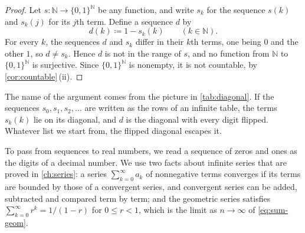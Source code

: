 \begin{proof}
Let $s\colon\mathbb N\to\{0,1\}^{\mathbb N}$ be any function, and write $s_k$ for the sequence $s(k)$ and $s_k(j)$ for its $j$th term. Define a sequence $d$ by
\[
d(k)\coloneqq1-s_k(k)\qquad(k\in\mathbb N).
\]
For every $k$, the sequences $d$ and $s_k$ differ in their $k$th terms, one being $0$ and the other $1$, so $d\ne s_k$. Hence $d$ is not in the range of $s$, and no function from $\mathbb N$ to $\{0,1\}^{\mathbb N}$ is surjective. Since $\{0,1\}^{\mathbb N}$ is nonempty, it is not countable, by \cref{cor:countable}\,(ii).
\end{proof}

The name of the argument comes from the picture in \cref{tab:diagonal}. If the sequences $s_0,s_1,s_2,\ldots$ are written as the rows of an infinite table, the terms $s_k(k)$ lie on its diagonal, and $d$ is the diagonal with every digit flipped. Whatever list we start from, the flipped diagonal escapes it.

\begin{table}
\end{table}

To pass from sequences to real numbers, we read a sequence of zeros and ones as the digits of a decimal number. We use two facts about infinite series that are proved in \cref{ch:series}: a series $\sum_{k=0}^\infty a_k$ of nonnegative terms converges if its terms are bounded by those of a convergent series, and convergent series can be added, subtracted and compared term by term; and the geometric series satisfies $\sum_{k=0}^\infty r^k=1/(1-r)$ for $0\le r<1$, which is the limit as $n\to\infty$ of \eqref{eq:sum-geom}.

